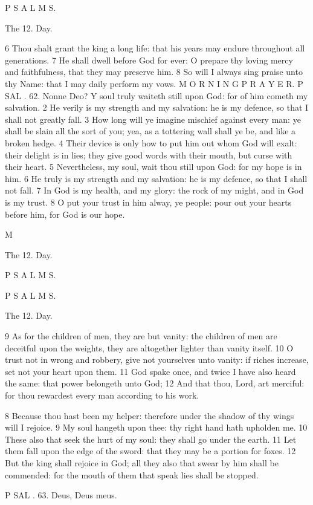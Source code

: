 P S A L M S.

The 12. Day.

6 Thou shalt grant the king a long life: that his years may endure throughout all generations. 7 He shall dwell before God for ever: O prepare thy loving mercy and faithfulness, that they may preserve him. 8 So will I always sing praise unto thy Name: that I may daily perform my vows. M O R N I N G P R A Y E R. P SAL . 62. Nonne Deo? Y soul truly waiteth still upon God: for of him cometh my salvation. 2 He verily is my strength and my salvation: he is my defence, so that I shall not greatly fall. 3 How long will ye imagine mischief against every man: ye shall be slain all the sort of you; yea, as a tottering wall shall ye be, and like a broken hedge. 4 Their device is only how to put him out whom God will exalt: their delight is in lies; they give good words with their mouth, but curse with their heart. 5 Nevertheless, my soul, wait thou still upon God: for my hope is in him. 6 He truly is my strength and my salvation: he is my defence, so that I shall not fall. 7 In God is my health, and my glory: the rock of my might, and in God is my trust. 8 O put your trust in him alway, ye people: pour out your hearts before him, for God is our hope.

M

The 12. Day.

P S A L M S.

P S A L M S.

The 12. Day.

9 As for the children of men, they are but vanity: the children of men are deceitful upon the weights, they are altogether lighter than vanity itself. 10 O trust not in wrong and robbery, give not yourselves unto vanity: if riches increase, set not your heart upon them. 11 God spake once, and twice I have also heard the same: that power belongeth unto God; 12 And that thou, Lord, art merciful: for thou rewardest every man according to his work.

8 Because thou hast been my helper: therefore under the shadow of thy wings will I rejoice. 9 My soul hangeth upon thee: thy right hand hath upholden me. 10 These also that seek the hurt of my soul: they shall go under the earth. 11 Let them fall upon the edge of the sword: that they may be a portion for foxes. 12 But the king shall rejoice in God; all they also that swear by him shall be commended: for the mouth of them that speak lies shall be stopped.

P SAL . 63. Deus, Deus meus.

